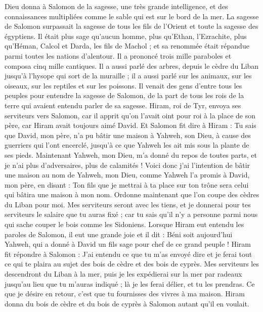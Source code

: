 \begin{multicols}{2}
Dieu donna à Salomon de la sagesse, une très grande intelligence, et des connaissances multipliées comme le sable qui est sur le bord de la mer.
La sagesse de Salomon surpassait la sagesse de tous les fils de l’Orient et toute la sagesse des égyptiens.
Il était plus sage qu’aucun homme, plus qu'Ethan, l’Ezrachite, plus qu'Héman, Calcol et Darda, les fils de Machol ; et sa renommée était répandue parmi toutes les nations d'alentour.
Il a prononcé trois mille paraboles et composa cinq mille cantiques.
Il a aussi parlé des arbres, depuis le cèdre du Liban jusqu'à l'hysope qui sort de la muraille ; il a aussi parlé sur les animaux, sur les oiseaux, sur les reptiles et sur les poissons.
Il venait des gens d'entre tous les peuples pour entendre la sagesse de Salomon, de la part de tous les rois de la terre qui avaient entendu parler de sa sagesse.
\VerseOne{}Hiram, roi de Tyr, envoya ses serviteurs vers Salomon, car il apprit qu'on l'avait oint pour roi à la place de son père, car Hiram avait toujours aimé David.
Et Salomon fit dire à Hiram :
Tu sais que David, mon père, n'a pu bâtir une maison à Yahweh, son Dieu, à cause des guerriers qui l'ont encerclé, jusqu'à ce que Yahweh les ait mis sous la plante de ses pieds.
Maintenant Yahweh, mon Dieu, m'a donné du repos de toutes parts, et je n'ai plus d’adversaires, plus de calamités !
Voici donc j’ai l’intention de bâtir une maison au nom de Yahweh, mon Dieu, comme Yahweh l’a promis à David, mon père, en disant : Ton fils que je mettrai à ta place sur ton trône sera celui qui bâtira une maison à mon nom.
Ordonne maintenant que l’on coupe des cèdres du Liban pour moi. Mes serviteurs seront avec les tiens, et je donnerai pour tes serviteurs le salaire que tu auras fixé ; car tu sais qu'il n'y a personne parmi nous qui sache couper le bois comme les Sidoniens.
Lorsque Hiram eut entendu les paroles de Salomon, il eut une grande joie et il dit : Béni soit aujourd'hui Yahweh, qui a donné à David un fils sage pour chef de ce grand peuple !
Hiram fit répondre à Salomon : J'ai entendu ce que tu m'as envoyé dire et je ferai tout ce qui te plaira au sujet des bois de cèdre et des bois de cyprès.
Mes serviteurs les descendront du Liban à la mer, puis je les expédierai sur la mer par radeaux jusqu'au lieu que tu m'auras indiqué ; là je les ferai délier, et tu les prendras. Ce que je désire en retour, c’est que tu fournisses des vivres à ma maison.
Hiram donna du bois de cèdre et du bois de cyprès à Salomon autant qu'il en voulait.

\end{multicols}
